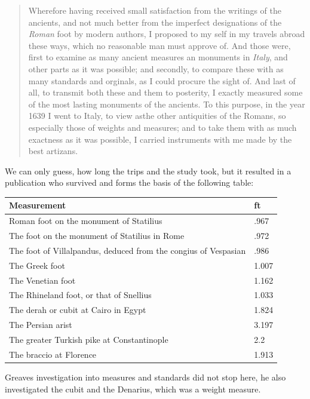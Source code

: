 \documentclass{tufte-book}
\begin{document}
\begin{quotation}
Wherefore having received small satisfaction from the writings of the ancients, and not much better from the imperfect designations of the \textit{Roman} foot by modern authors, I proposed to my self in my travels abroad these ways, which no
reasonable man must approve of. And those were, first to examine as many ancient measures an monuments in \textit{Italy}, and other parts as it was possible; and secondly, to compare these with as many standards and orginals, as I could procure the sight of. And last of all, to transmit both these and them to posterity, I exactly measured some of the most lasting monuments of the ancients. To this purpose, in the year 1639 I went to Italy, to view asthe other antiquities of the Romans, so especially those of weights and measures; and to take them with as much exactness as it was possible, I carried instruments with me made by the best artizans. 

\end{quotation}

We can only guess, how long the trips and the study took, but it resulted in a publication who survived and forms the basis of the following table:


\begin{tabular}{p{8cm}l}
\toprule
Measurement & ft\\
\midrule
Roman foot on the monument of Statilius & .967\\
The foot on the monument of Statilius in Rome & .972\\
The foot of Villalpandus, deduced from the congius of Vespasian & .986\\ 
The Greek foot & 1.007\\
The Venetian foot &1.162\\
The Rhineland foot, or that of Snellius &1.033\\
The derah or cubit at Cairo in Egypt &1.824\\
The Persian arist &3.197\\
The greater Turkish pike at Constantinople & 2.2\\
The braccio at Florence & 1.913\\

\bottomrule
\end{tabular}


Greaves investigation into measures and standards did not stop here, he also investigated the cubit and the Denarius, which was a weight measure.
\end{document}
